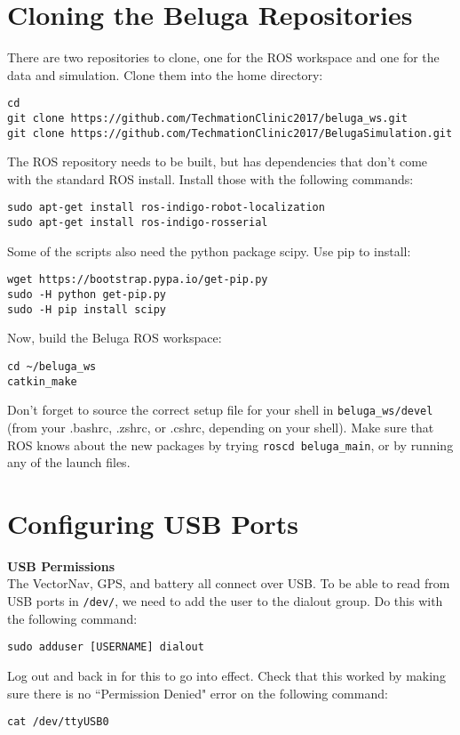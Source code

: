 \documentclass{article}
\begin{document}
\section*{Cloning the Beluga Repositories}
There are two repositories to clone, one for the ROS workspace and one for the data and simulation.
Clone them into the home directory:

\begin{verbatim}
cd
git clone https://github.com/TechmationClinic2017/beluga_ws.git
git clone https://github.com/TechmationClinic2017/BelugaSimulation.git
\end{verbatim}

The ROS repository needs to be built, but has dependencies that don't come with the standard ROS install.
Install those with the following commands:

\begin{verbatim}
sudo apt-get install ros-indigo-robot-localization
sudo apt-get install ros-indigo-rosserial
\end{verbatim}

Some of the scripts also need the python package scipy.
Use pip to install:
\begin{verbatim}
wget https://bootstrap.pypa.io/get-pip.py
sudo -H python get-pip.py
sudo -H pip install scipy
\end{verbatim}

Now, build the Beluga ROS workspace:

\begin{verbatim}
cd ~/beluga_ws
catkin_make
\end{verbatim}

Don't forget to source the correct setup file for your shell in \texttt{beluga\_ws/devel} (from your .bashrc, .zshrc, or .cshrc, depending on your shell).
Make sure that ROS knows about the new packages by trying \texttt{roscd beluga\_main}, or by running any of the launch files.

\section*{Configuring USB Ports}
{\bf USB Permissions} \\
The VectorNav, GPS, and battery all connect over USB.
To be able to read from USB ports in \texttt{/dev/}, we need to add the user to the dialout group.
Do this with the following command:
\begin{center}
\texttt{sudo adduser [USERNAME] dialout}
\end{center}
Log out and back in for this to go into effect.
Check that this worked by making sure there is no ``Permission Denied" error on the following command:
\begin{center}
\texttt{cat /dev/ttyUSB0}
\end{center}
\end{document}

